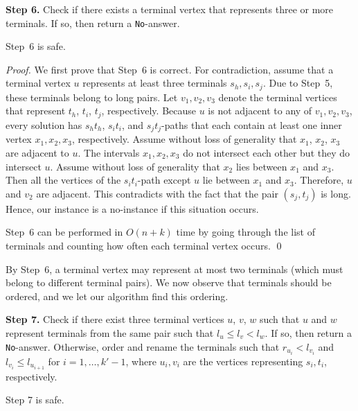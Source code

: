 \documentclass{llncs}
\begin{document}
\medskip
\noindent
{\bf Step 6.}
Check if there exists a terminal vertex that represents three or more terminals. If so, then return a \texttt{No}-answer.

\begin{lemma}\label{l-6}
Step~6 is safe.
\end{lemma}

\begin{proof}
We first prove that Step~6 is correct.
For contradiction, assume that a terminal vertex $u$ represents at least three terminals $s_h,s_i,s_j$.
Due to Step~5, these terminals belong to long pairs. 
Let $v_1,v_2,v_3$ denote the terminal vertices that represent $t_h$, $t_i$, $t_j$, respectively. 
Because $u$ is not adjacent to any of $v_1,v_2,v_3$, every solution has $s_ht_h$, $s_it_i$, and $s_jt_j$-paths that
each contain at least one inner vertex $x_1,x_2,x_3$, respectively. Assume without loss of generality that $x_1$, $x_2$, $x_3$
are  adjacent to $u$.  The intervals $x_1,x_2,x_3$ do not intersect each other but they do intersect $u$. 
Assume without loss of generality that $x_2$ lies between $x_1$ and $x_3$. 
Then all the vertices of the $s_it_i$-path except $u$ lie between $x_1$ and $x_3$. Therefore, $u$ and $v_2$ are adjacent.
This contradicts with the fact that the pair $(s_j,t_j)$ is long. Hence, our instance is a no-instance if this situation occurs.

Step~6 can be performed in $O(n+k)$ time by going through the list of terminals and counting how often each terminal vertex occurs.
\qed
\end{proof} 

By Step~6, a terminal vertex may represent at most two terminals (which must belong to different terminal pairs).
We now observe that terminals should be ordered, and we let our algorithm find this ordering.

\medskip
\noindent
{\bf Step 7.} Check if there exist three terminal vertices $u$, $v$, $w$ such that $u$ and $w$ represent terminals from 
the same pair such that $l_u\leq l_v<l_w$. If so, then return a \texttt{No}-answer. Otherwise, order and rename the terminals
such that 
$r_{u_i}< l_{v_i}$  and $l_{v_{i}}\leq l_{u_{i+1}}$ for $i=1,\ldots,k'-1$, where $u_i,v_i$ are the vertices representing $s_i,t_i$, respectively.

\begin{lemma}\label{l-7}
Step 7 is safe.
\end{lemma}
\end{document}
